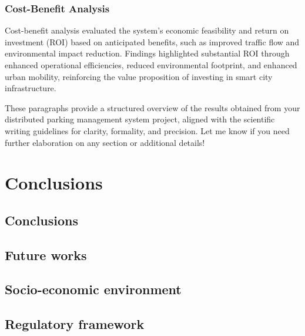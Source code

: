 \documentclass[oneside, 12pt, a4paper, draft]{book}
\begin{document}
\section{Cost-Benefit Analysis}
\label{sec:org5201134}

Cost-benefit analysis evaluated the system's economic feasibility and return on investment (ROI) based on anticipated benefits, such as improved traffic flow and environmental impact reduction. Findings highlighted substantial ROI through enhanced operational efficiencies, reduced environmental footprint, and enhanced urban mobility, reinforcing the value proposition of investing in smart city infrastructure.

These paragraphs provide a structured overview of the results obtained from your distributed parking management system project, aligned with the scientific writing guidelines for clarity, formality, and precision. Let me know if you need further elaboration on any section or additional details!
\part{Conclusions}
\label{sec:orgc407063}
\chapter{Conclusions}
\label{sec:org28b183a}
\chapter{Future works}
\label{sec:org63e0051}
\chapter{Socio-economic environment}
\label{sec:orgd07b846}
\chapter{Regulatory framework}
\label{sec:org68df2fb}
\printbibliography
{} %
\end{document}
